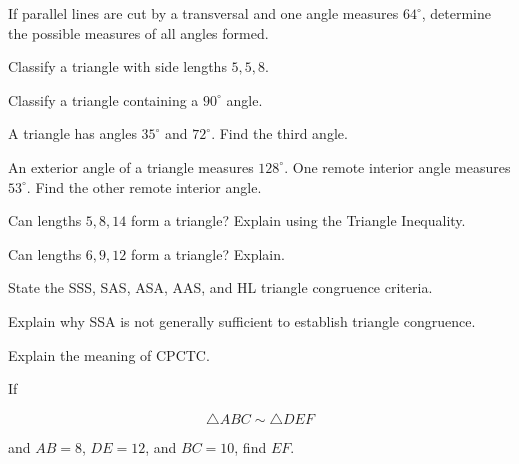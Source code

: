 \begin{exercise}[2]
If parallel lines are cut by a transversal and one angle measures
\(64^\circ\), determine the possible measures of all angles formed.
\end{exercise}

\begin{exercise}[1]
Classify a triangle with side lengths \(5,5,8\).
\end{exercise}

\begin{exercise}[1]
Classify a triangle containing a \(90^\circ\) angle.
\end{exercise}

\begin{exercise}[1]
A triangle has angles \(35^\circ\) and \(72^\circ\). Find the third angle.
\end{exercise}

\begin{exercise}[2]
An exterior angle of a triangle measures \(128^\circ\). One remote interior
angle measures \(53^\circ\). Find the other remote interior angle.
\end{exercise}

\begin{exercise}[2]
Can lengths \(5,8,14\) form a triangle? Explain using the Triangle
Inequality.
\end{exercise}

\begin{exercise}[2]
Can lengths \(6,9,12\) form a triangle? Explain.
\end{exercise}

\begin{exercise}[2]
State the SSS, SAS, ASA, AAS, and HL triangle congruence criteria.
\end{exercise}

\begin{exercise}[2]
Explain why SSA is not generally sufficient to establish triangle
congruence.
\end{exercise}

\begin{exercise}[2]
Explain the meaning of CPCTC.
\end{exercise}

\begin{exercise}[1]
If

\[ \triangle ABC\sim\triangle DEF \]

and \(AB=8\), \(DE=12\), and \(BC=10\), find \(EF\).
\end{exercise}

